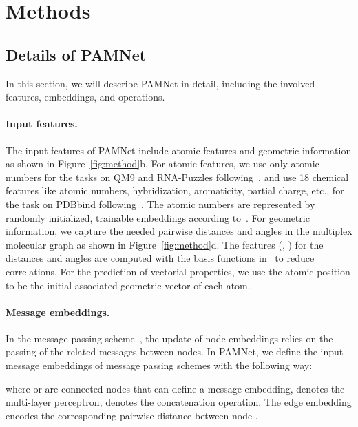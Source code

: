 \documentclass[fleqn,10pt]{wlscirep}
\newcommand{\method}{PAMNet\xspace}
\begin{document}
\section*{Methods}
\subsection*{Details of \method}
In this section, we will describe \method in detail, including the involved features, embeddings, and operations.

\paragraph{Input features.}
The input features of \method include atomic features and geometric information as shown in Figure~\ref{fig:method}b. For atomic features, we use only atomic numbers  for the tasks on QM9 and RNA-Puzzles following~\cite{schutt2018schnetpack,unke2019physnet,klicpera_dimenet_2020,klicpera_dimenetpp_2020,townshend2021geometric}, and use 18 chemical features like atomic numbers, hybridization, aromaticity, partial charge, etc., for the task on PDBbind following~\cite{stepniewska2018development,li2021structure}. The atomic numbers  are represented by randomly initialized, trainable embeddings according to~\cite{schutt2018schnetpack,unke2019physnet,klicpera_dimenet_2020,klicpera_dimenetpp_2020}. For geometric information, we capture the needed pairwise distances and angles in the multiplex molecular graph  as shown in Figure~\ref{fig:method}d. The features (, ) for the distances and angles are computed with the basis functions in~\cite{klicpera_dimenet_2020} to reduce correlations. For the prediction of vectorial properties, we use the atomic position  to be the initial associated geometric vector  of each atom.

\paragraph{Message embeddings.}
In the message passing scheme~\cite{gilmer2017neural}, the update of node embeddings  relies on the passing of the related messages  between nodes. In \method, we define the input message embeddings  of message passing schemes with the following way:

where  or  are connected nodes that can define a message embedding,  denotes the multi-layer perceptron,  denotes the concatenation operation. The edge embedding  encodes the corresponding pairwise distance  between node .
\end{document}
